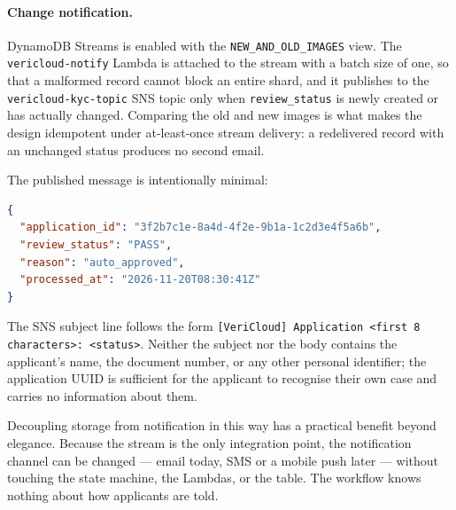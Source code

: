 \paragraph{Change notification.}
DynamoDB Streams is enabled with the \texttt{NEW\_AND\_OLD\_IMAGES} view. The
\texttt{vericloud-notify} Lambda is attached to the stream with a batch size of
one, so that a malformed record cannot block an entire shard, and it publishes to
the \texttt{vericloud-kyc-topic} SNS topic only when \texttt{review\_status} is
newly created or has actually changed. Comparing the old and new images is what
makes the design idempotent under at-least-once stream delivery: a redelivered
record with an unchanged status produces no second email.

The published message is intentionally minimal:

\begin{lstlisting}[language=json, caption={SNS payload emitted by \texttt{vericloud-notify}.}, label={lst:sns}]
{
  "application_id": "3f2b7c1e-8a4d-4f2e-9b1a-1c2d3e4f5a6b",
  "review_status": "PASS",
  "reason": "auto_approved",
  "processed_at": "2026-11-20T08:30:41Z"
}
\end{lstlisting}

The SNS subject line follows the form
\texttt{[VeriCloud] Application <first 8 characters>: <status>}. Neither the
subject nor the body contains the applicant's name, the document number, or any
other personal identifier; the application UUID is sufficient for the applicant to
recognise their own case and carries no information about them.

Decoupling storage from notification in this way has a practical benefit beyond
elegance. Because the stream is the only integration point, the notification
channel can be changed --- email today, SMS or a mobile push later --- without
touching the state machine, the Lambdas, or the table. The workflow knows nothing
about how applicants are told.
